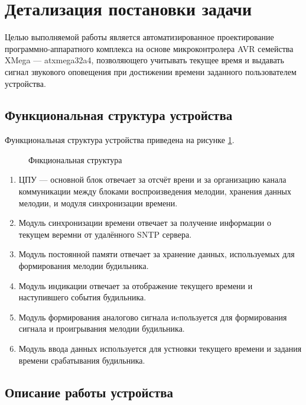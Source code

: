 \section{Детализация постановки задачи}
\begin{par}
Целью выполняемой работы является автоматизированное проектирование программно-аппаратного комплекса
на основе микроконтролера AVR семейства XMega --- atxmega32a4, позволяющего учитывать текущее время
и выдавать сигнал звукового оповещения при достижении времени заданного пользователем устройства.
\end{par}

\subsection{Функциональная структура устройства}

Функциональная структура устройства приведена на рисунке \ref{img:funcd}.

\begin{figure}[h]
	\caption{Фнкциональная структура}
	\label{img:funcd}
\end{figure}

\begin{enumerate}
    \item{}ЦПУ --- основной блок отвечает за отсчёт врени и за организацию канала коммуникации
        между блоками воспроизведения мелодии, хранения данных мелодии, и модуля синхронизации времени.
    \item{}Модуль синхронизации времени отвечает за получение информации о текущем веремни
            от удалённого SNTP сервера.
    \item{}Модуль постоянной памяти отвечает за хранение данных, используемых для формирования
        мелодии будильника.
    \item{}Модуль индикации отвечает за отображение текущего времени и наступившего события
        будильника.
    \item{}Модуль формирования аналогово сигнала иcпользуется для формирования сигнала и проигрывания
            мелодии будильника.
    \item{}Модуль ввода данных используется для устновки текущего времени и задания
        времени срабатывания будильника.
\end{enumerate}


\subsection{Описание работы устройства}
